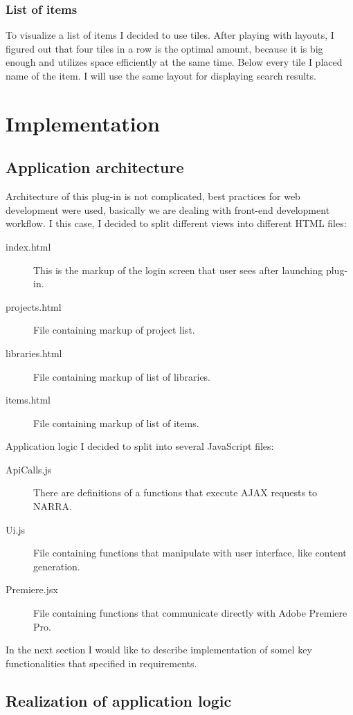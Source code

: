 \documentclass[thesis=B,english]{FITthesis}[2012/10/20]
\begin{document}
\subsection{List of items}
To visualize a list of items I decided to use tiles. After playing with layouts, I figured out that four tiles in a row is the optimal amount, because it is big enough and utilizes space efficiently at the same time. Below every tile I placed name of the item. I will use the same layout for displaying search results.
\chapter{Implementation}
\section{Application architecture}
Architecture of this plug-in is not complicated, best practices for web development were used, basically we are dealing with front-end development workflow. I this case, I decided to split different views into different HTML files:
	\begin{description}
		\item [index.html] This is the markup of the login screen that user sees after launching plug-in.
		\item [projects.html] File containing markup of project list.
		\item [libraries.html] File containing markup of list of libraries.
		\item [items.html] File containing markup of list of items.
	\end{description}
Application logic I decided to split into several JavaScript files:
	\begin{description}
		\item [ApiCalls.js] There are definitions of a functions that execute AJAX requests to NARRA.
		\item [Ui.js] File containing functions that manipulate with user interface, like content generation.
		\item [Premiere.jsx] File containing functions that communicate directly with Adobe Premiere Pro.
	\end{description}
In the next section I would like to describe implementation of somel key functionalities that specified in requirements.
\section{Realization of application logic}
\end{document}
